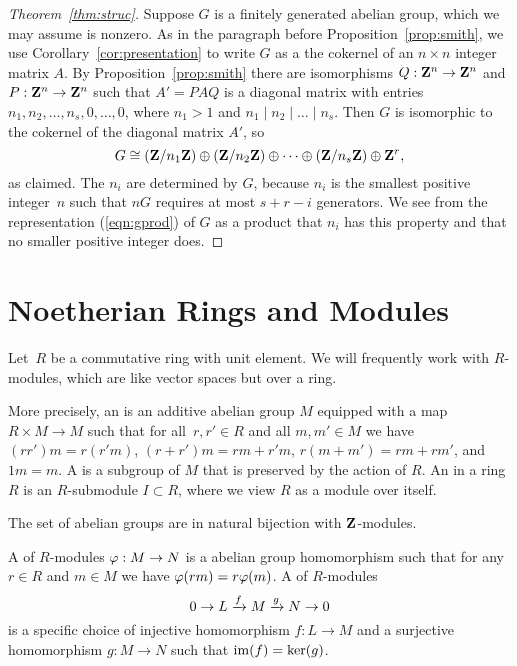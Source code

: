 \begin{proof}[Theorem~\ref{thm:struc}] 
Suppose $G$ is a finitely generated abelian group, which we may assume
is nonzero.  As in the paragraph before Proposition~\ref{prop:smith},
we use Corollary~\ref{cor:presentation} to write $G$ as a the cokernel
of an $n\times n$ integer matrix $A$.  By Proposition~\ref{prop:smith}
there are isomorphisms $Q:\mathbf{Z}^n\to \mathbf{Z}^n$ and $P:\mathbf{Z}^n\to \mathbf{Z}^n$ such that
$A'=PAQ$ is a diagonal matrix with entries $n_1, n_2,\ldots,
n_s,0,\ldots,0$, where $n_1>1$ and $n_1\mid n_2 \mid{} \ldots \mid{}
n_s$.  Then $G$ is isomorphic to the cokernel of the diagonal matrix
$A'$, so
\begin{equation}
\label{eqn:gprod}
  G \cong (\mathbf{Z}/n_1\mathbf{Z}) \oplus (\mathbf{Z}/n_2\mathbf{Z})
 \oplus \cdots \oplus (\mathbf{Z}/n_s\mathbf{Z}) \oplus \mathbf{Z}^{r},
\end{equation}
as claimed.  The $n_i$ are determined by $G$, because $n_i$ is the
smallest positive integer~$n$ such that $nG$ requires at most $s+r-i$
generators. We see from the representation (\ref{eqn:gprod}) of $G$ as
a product that $n_i$ has this property and that no smaller positive
integer does.

\end{proof}

\section{Noetherian Rings and Modules}\label{sec:noetherian}
Let~$R$ be a commutative ring with unit element.  We will frequently
work with $R$-modules, which are like vector spaces but over a ring.

More precisely, an  is an additive abelian
group $M$ equipped with a map $R\times M \to M$ such that for all~$r,
r'\in R$ and all $m, m'\in M$ we have $(r r')m = r(r' m )$, $(r + r')m
= rm + r' m$, $r(m+m') = rm + rm'$, and $1m=m$.  A 
is a subgroup of $M$ that is preserved by the action of $R$.
An  in a ring $R$ is an $R$-submodule $I\subset R$,
where we view $R$ as a module over itself.

\begin{example}
The set of abelian groups are in natural bijection with
$\mathbf{Z}$-modules.
\end{example}

A  of $R$-modules $\varphi:M\to N$ is a abelian group
homomorphism such that for any $r\in R$ and $m\in M$ we have
$\varphi(rm) = r\varphi(m)$.  A  of $R$-modules
$$0 \to L \xrightarrow{f} M \xrightarrow{g} N \to 0$$
is a specific choice of injective homomorphism $f:L\to M$ and 
a surjective homomorphism $g:M\to N$ such that $\operatorname{im}(f) = \ker(g)$.

